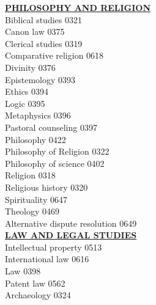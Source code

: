 \documentclass[9pt]{article}
\newcommand{\categoryheading}[1]{{\fontsize{8}{11}\selectfont \textbf{\uline{#1}}}}
\begin{document}
\begin{multicols}{3}
\categoryheading{PHILOSOPHY AND RELIGION} \leavevmode \\
Biblical studies \hfill 0321 \leavevmode \\
Canon law \hfill 0375 \leavevmode \\
Clerical studies \hfill 0319 \leavevmode \\
Comparative religion \hfill 0618 \leavevmode \\
Divinity \hfill 0376 \leavevmode \\
Epistemology \hfill 0393 \leavevmode \\
Ethics \hfill 0394 \leavevmode \\
Logic \hfill 0395 \leavevmode \\
Metaphysics \hfill 0396 \leavevmode \\
Pastoral counseling \hfill 0397 \leavevmode \\
Philosophy \hfill 0422 \leavevmode \\
Philosophy of Religion \hfill 0322 \leavevmode \\
Philosophy of science \hfill 0402 \leavevmode \\
Religion \hfill 0318 \leavevmode \\
Religious history \hfill 0320 \leavevmode \\
Spirituality \hfill 0647 \leavevmode \\
Theology \hfill 0469 \leavevmode \\
Alternative dispute resolution \hfill 0649 \leavevmode \\
\columnbreak
\categoryheading{LAW AND LEGAL STUDIES} \leavevmode \\
Intellectual property \hfill 0513 \leavevmode \\
International law \hfill 0616 \leavevmode \\
Law \hfill 0398 \leavevmode \\
Patent law \hfill 0562 \leavevmode \\
Archaeology \hfill 0324


\end{multicols}
\end{document}

